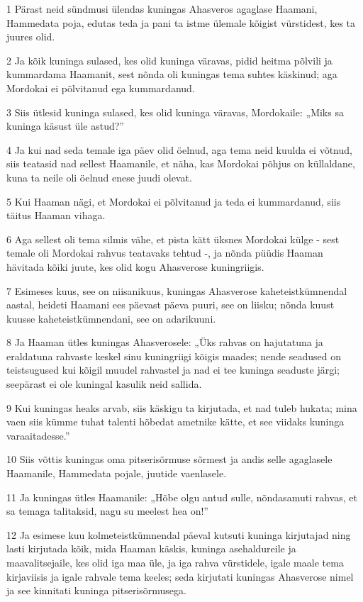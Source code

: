 \par 1 Pärast neid sündmusi ülendas kuningas Ahasveros agaglase Haamani, Hammedata poja, edutas teda ja pani ta istme ülemale kõigist vürstidest, kes ta juures olid.
\par 2 Ja kõik kuninga sulased, kes olid kuninga väravas, pidid heitma põlvili ja kummardama Haamanit, sest nõnda oli kuningas tema suhtes käskinud; aga Mordokai ei põlvitanud ega kummardanud.
\par 3 Siis ütlesid kuninga sulased, kes olid kuninga väravas, Mordokaile: „Miks sa kuninga käsust üle astud?”
\par 4 Ja kui nad seda temale iga päev olid öelnud, aga tema neid kuulda ei võtnud, siis teatasid nad sellest Haamanile, et näha, kas Mordokai põhjus on küllaldane, kuna ta neile oli öelnud enese juudi olevat.
\par 5 Kui Haaman nägi, et Mordokai ei põlvitanud ja teda ei kummardanud, siis täitus Haaman vihaga.
\par 6 Aga sellest oli tema silmis vähe, et pista kätt üksnes Mordokai külge - sest temale oli Mordokai rahvus teatavaks tehtud -, ja nõnda püüdis Haaman hävitada kõiki juute, kes olid kogu Ahasverose kuningriigis.
\par 7 Esimeses kuus, see on niisanikuus, kuningas Ahasverose kaheteistkümnendal aastal, heideti Haamani ees päevast päeva puuri, see on liisku; nõnda kuust kuusse kaheteistkümnendani, see on adarikuuni.
\par 8 Ja Haaman ütles kuningas Ahasverosele: „Üks rahvas on hajutatuna ja eraldatuna rahvaste keskel sinu kuningriigi kõigis maades; nende seadused on teistsugused kui kõigil muudel rahvastel ja nad ei tee kuninga seaduste järgi; seepärast ei ole kuningal kasulik neid sallida.
\par 9 Kui kuningas heaks arvab, siis käskigu ta kirjutada, et nad tuleb hukata; mina vaen siis kümme tuhat talenti hõbedat ametnike kätte, et see viidaks kuninga varaaitadesse.”
\par 10 Siis võttis kuningas oma pitserisõrmuse sõrmest ja andis selle agaglasele Haamanile, Hammedata pojale, juutide vaenlasele.
\par 11 Ja kuningas ütles Haamanile: „Hõbe olgu antud sulle, nõndasamuti rahvas, et sa temaga talitaksid, nagu su meelest hea on!”
\par 12 Ja esimese kuu kolmeteistkümnendal päeval kutsuti kuninga kirjutajad ning lasti kirjutada kõik, mida Haaman käskis, kuninga asehaldureile ja maavalitsejaile, kes olid iga maa üle, ja iga rahva vürstidele, igale maale tema kirjaviisis ja igale rahvale tema keeles; seda kirjutati kuningas Ahasverose nimel ja see kinnitati kuninga pitserisõrmusega.
